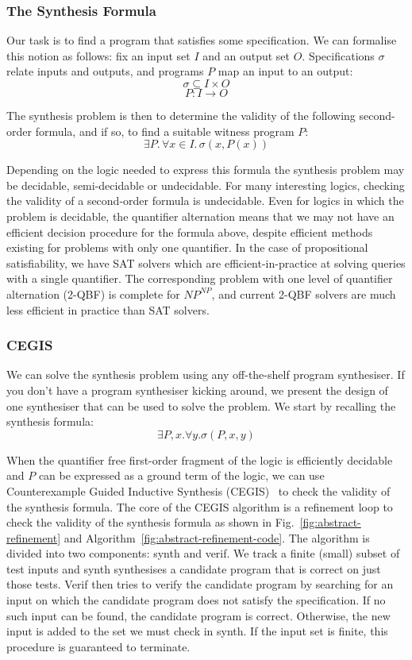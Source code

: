 \subsubsection{The Synthesis Formula}
\label{sec:abstract-formula}

Our task is to find a program that satisfies some specification.  We can formalise this
notion as follows: fix an input set $I$ and an output set $O$.  Specifications $\sigma$
relate inputs and outputs, and programs $P$ map an input to an output:
%
$$ \sigma \subseteq I \times O $$
$$ P : I \rightarrow O$$

The synthesis problem is then to determine the validity of the following
second-order formula, and if so, to find a suitable witness program $P$:
%
$$\exists P .\, \forall x \in I.\, \sigma(x, P(x))$$

Depending on the logic needed to express this formula the synthesis problem
may be decidable, semi-decidable or undecidable.  For many interesting
logics, checking the validity of a second-order formula is undecidable. 
Even for logics in which the problem is decidable, the quantifier
alternation means that we may not have an efficient decision procedure for
the formula above, despite efficient methods existing for problems
with only one quantifier.  In the case of propositional
satisfiability, we have SAT solvers which are efficient-in-practice at
solving queries with a single quantifier.  The corresponding problem with
one level of quantifier alternation (2-QBF) is complete for $NP^{NP}$, and
current 2-QBF solvers are much less efficient in practice than SAT solvers.

\subsubsection{CEGIS}

\fi
We can solve the synthesis problem using any off-the-shelf program synthesiser.  If you don't
have a program synthesiser kicking around, we present the design of one synthesiser
that can be used to solve the problem.
We start by recalling the synthesis formula:
 $$\exists P, x . \forall y . \sigma(P, x, y)$$

When the quantifier free first-order fragment of the logic is efficiently decidable and
$P$ can be expressed as a ground term of the logic, we can use
Counterexample Guided Inductive Synthesis (CEGIS)~\cite{lezama-thesis,sketch} to
check the validity of the synthesis formula.  The core of the CEGIS algorithm is
a refinement loop to check the
validity of the synthesis formula as shown in Fig.~\ref{fig:abstract-refinement} and
Algorithm~\ref{fig:abstract-refinement-code}.  The algorithm is divided into two
components: {\sc synth} and {\sc verif}.  We track a finite (small) subset of test inputs
and {\sc synth} synthesises a candidate program that is correct on just those tests.
{\sc Verif} then tries to verify the candidate program by searching for an input on
which the candidate program does not satisfy the specification.  If no such input
can be found, the candidate program is correct.  Otherwise, the new input is added
to the set we must check in {\sc synth}.  If the input set is finite, this
procedure is guaranteed to terminate.

